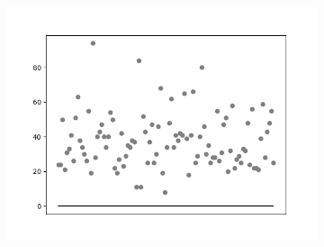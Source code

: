 \begin{figure}[hb!]
\begin{subfigure}[hb]{0.5\linewidth}
		 \includegraphics[width=\linewidth]{img/graficos/reta0/lenet/fig-reta-0-image-treat-3-lenet-lrelu.png}
		\end{subfigure}%
	\end{figure}


